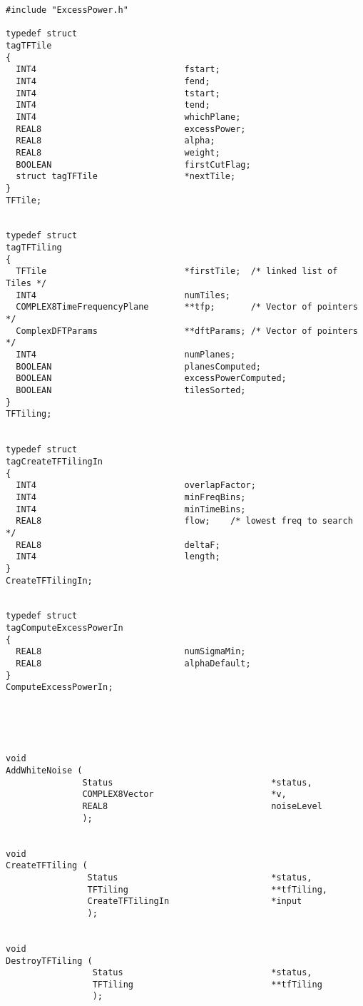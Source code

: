 \documentclass{article}
\begin{document}
\begin{verbatim}
#include "ExcessPower.h"

typedef struct
tagTFTile
{
  INT4                             fstart;
  INT4                             fend;
  INT4                             tstart;
  INT4                             tend;
  INT4                             whichPlane;
  REAL8                            excessPower;
  REAL8                            alpha;
  REAL8                            weight;
  BOOLEAN                          firstCutFlag;  
  struct tagTFTile                 *nextTile;
}
TFTile;


typedef struct
tagTFTiling
{
  TFTile                           *firstTile;  /* linked list of Tiles */
  INT4                             numTiles;
  COMPLEX8TimeFrequencyPlane       **tfp;       /* Vector of pointers */
  ComplexDFTParams                 **dftParams; /* Vector of pointers */
  INT4                             numPlanes;
  BOOLEAN                          planesComputed;      
  BOOLEAN                          excessPowerComputed;
  BOOLEAN                          tilesSorted;
}
TFTiling;


typedef struct
tagCreateTFTilingIn
{
  INT4                             overlapFactor;
  INT4                             minFreqBins;
  INT4                             minTimeBins;
  REAL8                            flow;    /* lowest freq to search       */
  REAL8                            deltaF;  
  INT4                             length;  
}
CreateTFTilingIn;


typedef struct
tagComputeExcessPowerIn
{
  REAL8                            numSigmaMin;
  REAL8                            alphaDefault;                             
}
ComputeExcessPowerIn;





void
AddWhiteNoise (
               Status                               *status,
               COMPLEX8Vector                       *v,
               REAL8                                noiseLevel
               );


void
CreateTFTiling (
                Status                              *status,
                TFTiling                            **tfTiling,
                CreateTFTilingIn                    *input
                );


void
DestroyTFTiling (
                 Status                             *status,
                 TFTiling                           **tfTiling
                 );



\end{verbatim}
\end{document}
